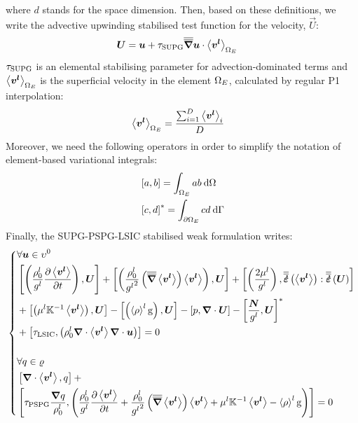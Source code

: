 where $d$ stands for the space dimension. Then, based on these definitions, we write the advective upwinding 
stabilised test function for the velocity, $\vec{U}$:
\begin{align}
\label{eq:supg_test}
& \vec{U} = \vec{u} + \tausupg \nabmat \vec{u} \cdot \vit_{\Ohm_E}
\end{align}
$\tau_\text{SUPG}$ is an elemental stabilising parameter for advection-dominated terms and $\left \langle \boldsymbol{v^l} \right \rangle_{\Omega_E}$
is the superficial velocity in the element ${\Omega_E}$, calculated by regular P1 interpolation:
\begin{align}
& \left \langle \boldsymbol{v^l} \right \rangle_{\Omega_E} = \frac{\sum_{i=1}^{D} \left \langle \boldsymbol{v^l} \right \rangle_{i}}{D}
\end{align}
Moreover, we need the following operators in order to simplify the notation of element-based variational integrals:
\begin{align}
& \left[ a,b \right] = \int_{\Omega_E} ab\: \mathrm{d}\Omega \\
& \left[ c,d \right]^{*} = \int_{\partial\Omega_E} cd\: \mathrm{d}\Gamma
\end{align}
Finally, the SUPG-PSPG-LSIC stabilised weak formulation writes:
\begin{equation}
	\label{eq:weakform_before}
   \left\{
   \begin{aligned}
      &\forall \vec{u} \in \upsilon^0 \\
	&\crochet{ \brac{\frac{\rholref}{\gl} \tempup{\vit}},\vec{U}} + 
	 \crochet{ \brac{\frac{\rholref}{\gl^2} \brac{\nabmat \vit} \vit},\vec{U}} + 
	 \crochet{\brac{\frac{2\mul}{\gl}}, \strainrate\brac{\vit}:\strainrate\brac{\vec{U}} } \\
	& + \crochet{\brac{\mul \K^{-1} \vit },\vec{U}}
	 - \crochet{\brac{\rhol \gravity},\vec{U}}
	 - \crochet{p,\nabvec \cdot \vec{U}}
	 - \crochet{\frac{\vec{N}}{\gl},\vec{U}}^{*} \\
	 & + \crochet{\taulsic, \brac{\rholref \nabvec \cdot \vit \nabvec \cdot \vec{u} }} = 0\\ \\
	 &\forall q \in \varrho \\
	&\crochet{ \nabvec \cdot \vit, q} + \\
	&\crochet{\taupspg \frac{\nabvec q}{\rholref}, \brac{\frac{\rholref}{\gl} \tempup{\vit} 
	+ \frac{\rholref}{\gl^2} \brac{\nabmat \vit} \vit 
	+ \mul \K^{-1} \vit -\rhol \gravity}} = 0
    \end{aligned}
    \right.
\end{equation}
